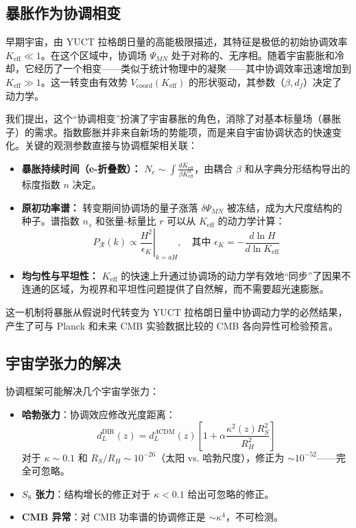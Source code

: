\documentclass[11pt,a4paper]{article}
\begin{document}
	\subsection{暴胀作为协调相变}
	\label{subsec:inflation-transition}
	
	早期宇宙，由 YUCT 拉格朗日量的高能极限描述，其特征是极低的初始协调效率 $K_{\mathrm{eff}} \ll 1$。在这个区域中，协调场 $\Psi_{MN}$ 处于对称的、无序相。随着宇宙膨胀和冷却，它经历了一个相变——类似于统计物理中的凝聚——其中协调效率迅速增加到 $K_{\mathrm{eff}} \gg 1$。这一转变由有效势 $V_{\mathrm{coord}}(K_{\mathrm{eff}})$ 的形状驱动，其参数（$\beta, d_f$）决定了动力学。
	
	我们提出，这个“协调相变”扮演了宇宙暴胀的角色，消除了对基本标量场（暴胀子）的需求。指数膨胀并非来自新场的势能项，而是来自宇宙协调状态的快速变化。关键的观测参数直接与协调框架相关联：
	
	\begin{itemize}
		\item \textbf{暴胀持续时间（e-折叠数）：} $N_e \sim \int \frac{dK_{\mathrm{eff}}}{\beta K_{\mathrm{eff}}^n} $，由耦合 $\beta$ 和从字典分形结构导出的标度指数 $n$ 决定。
		\item \textbf{原初功率谱：} 转变期间协调场的量子涨落 $\delta \Psi_{MN}$ 被冻结，成为大尺度结构的种子。谱指数 $n_s$ 和张量-标量比 $r$ 可以从 $K_{\mathrm{eff}}$ 的动力学计算：
		\begin{equation}
			P_{\mathcal{R}}(k) \propto \left. \frac{H^2}{\epsilon_K} \right|_{k=aH}, \quad \text{其中 } \epsilon_K = -\frac{d\ln H}{d\ln K_{\mathrm{eff}}}
		\end{equation}
		\item \textbf{均匀性与平坦性：} $K_{\mathrm{eff}}$ 的快速上升通过协调场的动力学有效地“同步”了因果不连通的区域，为视界和平坦性问题提供了自然解，而不需要超光速膨胀。
	\end{itemize}
	
	这一机制将暴胀从假说时代转变为 YUCT 拉格朗日量中协调动力学的必然结果，产生了可与 Planck 和未来 CMB 实验数据比较的 CMB 各向异性可检验预言。
	
	\subsection{宇宙学张力的解决}
	
	协调框架可能解决几个宇宙学张力：
	
	\begin{itemize}
		\item \textbf{哈勃张力}：协调效应修改光度距离：
		\begin{equation}
			d_L^{\text{DIR}}(z) = d_L^{\Lambda\text{CDM}}(z) \left[ 1 + \alpha \frac{\kappa^2(z) R_S^2}{R_H^2} \right]
		\end{equation}
		对于 $\kappa \sim 0.1$ 和 $R_S/R_H \sim 10^{-26}$（太阳 vs. 哈勃尺度），修正为 $\sim 10^{-52}$——完全可忽略。
		
		\item \textbf{$S_8$ 张力}：结构增长的修正对于 $\kappa < 0.1$ 给出可忽略的修正。
		
		\item \textbf{CMB 异常}：对 CMB 功率谱的协调修正是 $\sim \kappa^4$，不可检测。
	\end{itemize}
	
\end{document}
